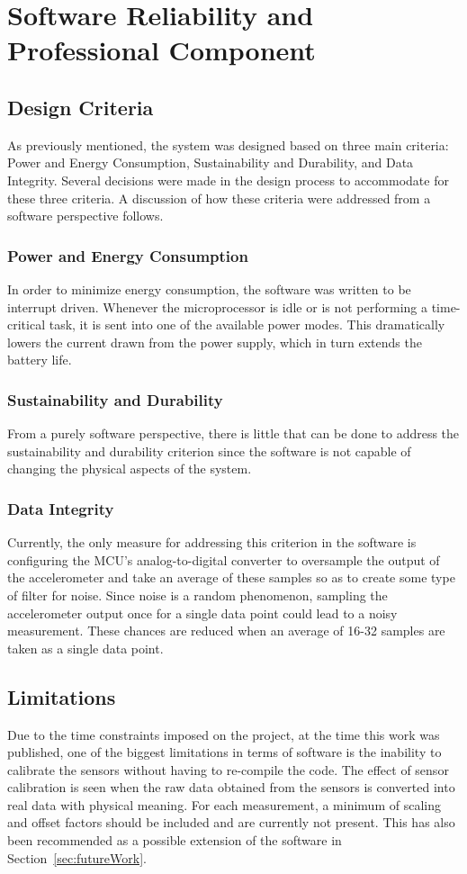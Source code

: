 \section{Software Reliability and Professional Component}

\subsection{Design Criteria}
As previously mentioned, the system was designed based on three main criteria: Power and Energy Consumption, Sustainability and Durability, and Data Integrity.  Several decisions were made in the design process to accommodate for these three criteria.  A discussion of how these criteria were addressed from a software perspective follows.

\subsubsection{Power and Energy Consumption}
In order to minimize energy consumption, the software was written to be interrupt driven.  Whenever the microprocessor is idle or is not performing a time-critical task, it is sent into one of the available power modes.  This dramatically lowers the current drawn from the power supply, which in turn extends the battery life.

\subsubsection{Sustainability and Durability}
From a purely software perspective, there is little that can be done to address the sustainability and durability criterion since the software is not capable of changing the physical aspects of the system.

\subsubsection{Data Integrity}
Currently, the only measure for addressing this criterion in the software is configuring the MCU's analog-to-digital converter to oversample the output of the accelerometer and take an average of these samples so as to create some type of filter for noise.  Since noise is a random phenomenon, sampling the accelerometer output once for a single data point could lead to a noisy measurement.  These chances are reduced when an average of 16-32 samples are taken as a single data point.

\subsection{Limitations}
Due to the time constraints imposed on the project, at the time this work was published, one of the biggest limitations in terms of software is the inability to calibrate the sensors without having to re-compile the code.  The effect of sensor calibration is seen when the raw data obtained from the sensors is converted into real data with physical meaning.  For each measurement, a minimum of scaling and offset factors should be included and are currently not present.  This has also been recommended as a possible extension of the software in Section~\ref{sec:futureWork}. 